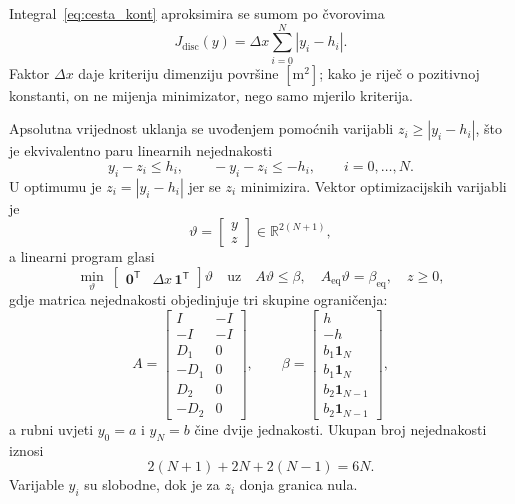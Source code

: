 Integral~\eqref{eq:cesta_kont} aproksimira se sumom po čvorovima
\begin{equation}
J_{\mathrm{disc}}(y) = \Delta x \sum_{i=0}^{N} |y_i - h_i| .
\label{eq:cesta_disc}
\end{equation}
Faktor $\Delta x$ daje kriteriju dimenziju površine $[\mathrm{m}^2]$; kako je riječ o pozitivnoj konstanti, on ne mijenja minimizator, nego samo mjerilo kriterija.

Apsolutna vrijednost uklanja se uvođenjem pomoćnih varijabli $z_i \geq |y_i - h_i|$, što je ekvivalentno paru linearnih nejednakosti
\begin{equation}
y_i - z_i \leq h_i, \qquad -y_i - z_i \leq -h_i, \qquad i = 0, \dots, N .
\end{equation}
U optimumu je $z_i = |y_i - h_i|$ jer se $z_i$ minimizira. Vektor optimizacijskih varijabli je
\begin{equation}
\vartheta = \begin{bmatrix} y \\ z \end{bmatrix} \in \mathbb{R}^{2(N+1)},
\end{equation}
a linearni program glasi
\begin{equation}
\min_{\vartheta} \ \begin{bmatrix} \mathbf{0}^{\mathsf{T}} & \Delta x \, \mathbf{1}^{\mathsf{T}} \end{bmatrix} \vartheta
\quad \text{uz} \quad A \vartheta \leq \beta, \quad A_{\mathrm{eq}} \vartheta = \beta_{\mathrm{eq}}, \quad z \geq 0,
\label{eq:cesta_lp}
\end{equation}
gdje matrica nejednakosti objedinjuje tri skupine ograničenja:
\begin{equation}
A = \begin{bmatrix}
I & -I \\
-I & -I \\
D_1 & 0 \\
-D_1 & 0 \\
D_2 & 0 \\
-D_2 & 0
\end{bmatrix}, \qquad
\beta = \begin{bmatrix}
h \\ -h \\
b_1 \mathbf{1}_N \\ b_1 \mathbf{1}_N \\
b_2 \mathbf{1}_{N-1} \\ b_2 \mathbf{1}_{N-1}
\end{bmatrix},
\end{equation}
a rubni uvjeti $y_0 = a$ i $y_N = b$ čine dvije jednakosti. Ukupan broj nejednakosti iznosi
\begin{equation}
2(N+1) + 2N + 2(N-1) = 6N .
\end{equation}
Varijable $y_i$ su slobodne, dok je za $z_i$ donja granica nula.

